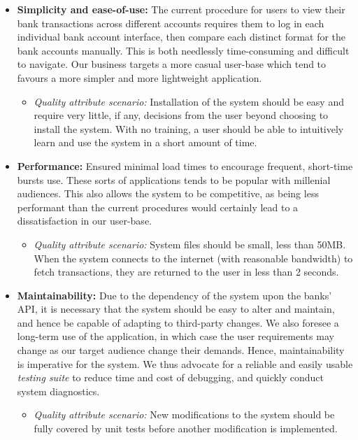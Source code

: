 \documentclass[11pt]{article}
\newcounter{use case ID}
\newcounter{req ID}
\begin{document}
\begin{itemize}
    \item \textbf{Simplicity and ease-of-use:} The current procedure for users to view their bank transactions across different accounts requires them to log in each individual bank account interface, then compare each distinct format for the bank accounts manually. This is both needlessly time-consuming and difficult to navigate. Our business targets a more casual user-base which tend to favours a more simpler and more lightweight application.
        \begin{itemize}
            \item \textit{Quality attribute scenario:} Installation of the system should be easy and require very little, if any, decisions from the user beyond choosing to install the system. With no training, a user should be able to intuitively learn and use the system in a short amount of time.
        \end{itemize}
    \item \textbf{Performance:} Ensured minimal load times to encourage frequent, short-time bursts use. These sorts of applications tends to be popular with millenial audiences. This also allows the system to be competitive, as being less performant than the current procedures would certainly lead to a dissatisfaction in our user-base.
        \begin{itemize}
            \item \textit{Quality attribute scenario:} System files should be small, less than 50MB. When the system connects to the internet (with reasonable bandwidth) to fetch transactions, they are returned to the user in less than 2 seconds.
        \end{itemize}
    \item \textbf{Maintainability:} Due to the dependency of the system upon the banks' API, it is necessary that the system should be easy to alter and maintain, and hence be capable of adapting to third-party changes. We also foresee a long-term use of the application, in which case the user requirements may change as our target audience change their demands. Hence, maintainability is imperative for the system. We thus advocate for a reliable and easily usable \textit{testing suite} to reduce time and cost of debugging, and quickly conduct system diagnostics.
        \begin{itemize}
            \item \textit{Quality attribute scenario:} New modifications to the system should be fully covered by unit tests before another modification is implemented.

\end{itemize}
\end{itemize}
\end{document}
